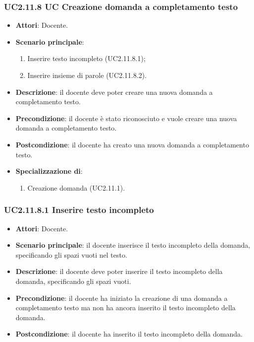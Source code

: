 \subsubsection{UC2.11.8 UC Creazione domanda a completamento testo}
\begin{itemize}
\item \textbf{Attori}: Docente.
\item \textbf{Scenario principale}:
\begin{enumerate}
\item Inserire testo incompleto (UC2.11.8.1);
\item Inserire insieme di parole (UC2.11.8.2).
\end{enumerate}
\item \textbf{Descrizione}: il docente deve poter creare una nuova domanda a completamento testo.
\item \textbf{Precondizione}: il docente è stato riconosciuto e vuole creare una nuova domanda a completamento testo.
\item \textbf{Postcondizione}: il docente ha creato una nuova domanda a completamento testo.
\item \textbf{Specializzazione di}:
\begin{enumerate}
\item Creazione domanda (UC2.11.1).
\end{enumerate}
\end{itemize}
\subsubsection{UC2.11.8.1 Inserire testo incompleto}
\begin{itemize}
\item \textbf{Attori}: Docente.
\item \textbf{Scenario principale}: il docente inserisce il testo incompleto della domanda, specificando gli spazi vuoti nel testo.
\item \textbf{Descrizione}: il docente deve poter inserire il testo incompleto della domanda, specificando gli spazi vuoti.
\item \textbf{Precondizione}: il docente ha iniziato la creazione di una domanda a completamento testo ma non ha ancora inserito il testo incompleto della domanda.
\item \textbf{Postcondizione}: il docente ha inserito il testo incompleto della domanda.
\end{itemize}
